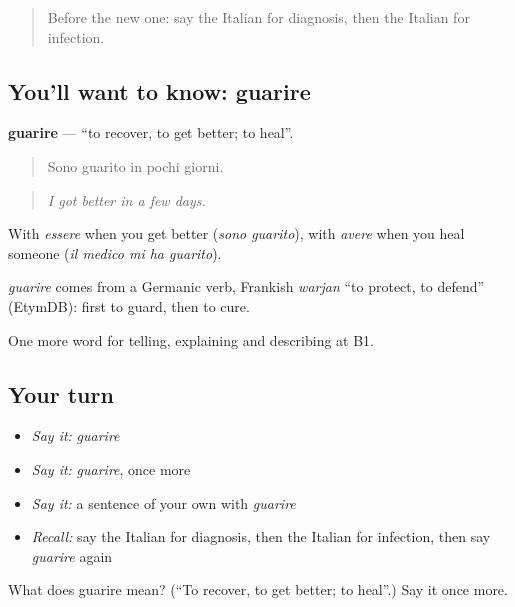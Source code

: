 \label{lesson:IT-C489-guarire}



\begin{quote}
Before the new one: say the Italian for diagnosis, then the Italian for infection.
\end{quote}

\subsection*{You'll want to know: guarire}
\textbf{guarire} — \textquotedblleft{}to recover, to get better; to heal\textquotedblright{}.

\begin{quote}
Sono guarito in pochi giorni.
\end{quote}

\begin{quote}
\emph{I got better in a few days.}
\end{quote}

With \emph{essere} when you get better (\emph{sono guarito}), with \emph{avere} when you heal someone (\emph{il medico mi ha guarito}).

\begin{cousinweb}
\emph{guarire} comes from a Germanic verb, Frankish \emph{warjan} \textquotedblleft{}to protect, to defend\textquotedblright{} (EtymDB): first to guard, then to cure.
\end{cousinweb}

\begin{grammarlens}[title={What you've built}]
One more word for telling, explaining and describing at B1.
\end{grammarlens}

\subsection*{Your turn}
\begin{itemize}
\raggedright
  \item \emph{Say it:} \emph{guarire}
  \item \emph{Say it:} \emph{guarire}, once more
  \item \emph{Say it:} a sentence of your own with \emph{guarire}
  \item \emph{Recall:} say the Italian for diagnosis, then the Italian for infection, then say \emph{guarire} again
\end{itemize}

\begin{tcolorbox}[breakable,colback=teal!4,colframe=teal!35!black,title={Before you move on}]
What does guarire mean? (\textquotedblleft{}To recover, to get better; to heal\textquotedblright{}.) Say it once more.
\end{tcolorbox}
